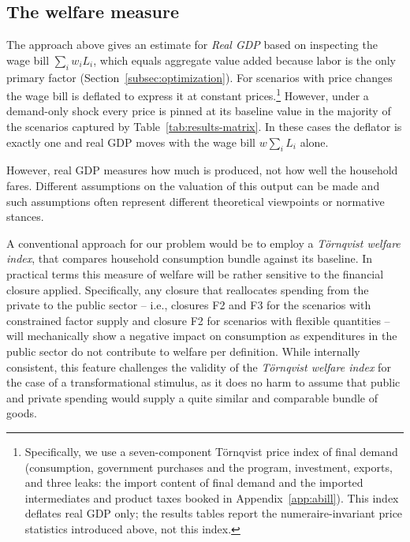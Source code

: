 \subsection{The welfare measure}\label{subsec:welfare}

The approach above gives an estimate for \emph{Real GDP} based on inspecting
the wage bill $\sum_i w_i L_i$, which equals aggregate value added because labor is the only primary factor (Section~\ref{subsec:optimization}). For scenarios with price changes the wage bill is deflated to express it at constant prices.\footnote{Specifically, we use a seven-component T\"ornqvist price index of final demand (consumption, government purchases and the program, investment, exports, and three leaks: the import content of final demand and the imported intermediates and product taxes booked in Appendix~\ref{app:abill}). This index deflates real GDP only; the results tables report the numeraire-invariant price statistics introduced above, not this index.} However, under a demand-only shock every price is pinned at its baseline value in the majority of the scenarios captured by Table~\ref{tab:results-matrix}. In these cases the deflator is exactly one and real GDP moves with the wage bill $w\sum_i L_i$ alone. 

However, real GDP measures how much is produced, not how well the household fares. Different assumptions on the valuation of this output can be made and  such assumptions often represent different theoretical viewpoints or normative stances. 

A conventional approach for our problem would be to employ a \emph{T\"ornqvist welfare index}, that compares household consumption bundle against its baseline.  In practical terms this measure of welfare will be rather sensitive to the financial closure applied. Specifically, any closure that reallocates spending from the private to the public sector -- i.e., closures F2 and F3 for the scenarios with constrained factor supply and closure F2 for scenarios with flexible quantities -- will mechanically show a negative impact on consumption as expenditures in the public sector do not contribute to welfare per definition. While internally consistent, this feature challenges the validity of the \emph{T\"ornqvist welfare index} for the case of a transformational stimulus, as it does no harm to assume that public and private spending would supply a quite similar and comparable bundle of goods. 

